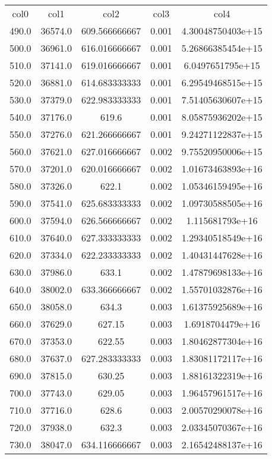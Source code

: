 \begin{table}
\begin{tabular}{ccccc}
col0 & col1 & col2 & col3 & col4 \\
490.0 & 36574.0 & 609.566666667 & 0.001 & 4.30048750403e+15 \\
500.0 & 36961.0 & 616.016666667 & 0.001 & 5.26866385454e+15 \\
510.0 & 37141.0 & 619.016666667 & 0.001 & 6.0497651795e+15 \\
520.0 & 36881.0 & 614.683333333 & 0.001 & 6.29549468515e+15 \\
530.0 & 37379.0 & 622.983333333 & 0.001 & 7.51405630607e+15 \\
540.0 & 37176.0 & 619.6 & 0.001 & 8.05875936202e+15 \\
550.0 & 37276.0 & 621.266666667 & 0.001 & 9.24271122837e+15 \\
560.0 & 37621.0 & 627.016666667 & 0.002 & 9.75520950006e+15 \\
570.0 & 37201.0 & 620.016666667 & 0.002 & 1.01673463893e+16 \\
580.0 & 37326.0 & 622.1 & 0.002 & 1.05346159495e+16 \\
590.0 & 37541.0 & 625.683333333 & 0.002 & 1.09730588505e+16 \\
600.0 & 37594.0 & 626.566666667 & 0.002 & 1.115681793e+16 \\
610.0 & 37640.0 & 627.333333333 & 0.002 & 1.29340518549e+16 \\
620.0 & 37334.0 & 622.233333333 & 0.002 & 1.40431447628e+16 \\
630.0 & 37986.0 & 633.1 & 0.002 & 1.47879698133e+16 \\
640.0 & 38002.0 & 633.366666667 & 0.002 & 1.55701032876e+16 \\
650.0 & 38058.0 & 634.3 & 0.003 & 1.61375925689e+16 \\
660.0 & 37629.0 & 627.15 & 0.003 & 1.6918704479e+16 \\
670.0 & 37353.0 & 622.55 & 0.003 & 1.80462877304e+16 \\
680.0 & 37637.0 & 627.283333333 & 0.003 & 1.83081172117e+16 \\
690.0 & 37815.0 & 630.25 & 0.003 & 1.88161322319e+16 \\
700.0 & 37743.0 & 629.05 & 0.003 & 1.96457961517e+16 \\
710.0 & 37716.0 & 628.6 & 0.003 & 2.00570290078e+16 \\
720.0 & 37938.0 & 632.3 & 0.003 & 2.03345070367e+16 \\
730.0 & 38047.0 & 634.116666667 & 0.003 & 2.16542488137e+16 \\

\end{tabular}
\end{table}
